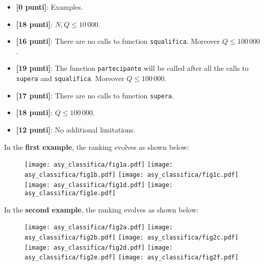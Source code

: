 \begin{itemize}[nolistsep,itemsep=2mm]
  \item \textbf{ [\phantom{1}0 punti]}: Examples.
  \item \textbf{ [18 punti]}: $N, Q \leq 10\,000$.
  \item \textbf{ [16 punti]}: There are no calls to function \texttt{squalifica}. Moreover $Q \leq 100\,000$.
  \item \textbf{ [19 punti]}: The function \texttt{partecipante} will be called after all the calls to \texttt{supera} and \texttt{squalifica}. Moreover $Q \leq 100\,000$.
  \item \textbf{ [17 punti]}: There are no calls to function \texttt{supera}.
  \item \textbf{ [18 punti]}: $Q \leq 100\,000$.
  \item \textbf{ [12 punti]}: No additional limitations.
\end{itemize}



\Examples

\begin{example}
%
%
\end{example}


\pagebreak

\Explanation

In the \textbf{first example}, the ranking evolves as shown below:
\begin{figure}[H]
	\centering
	\texttt{[image: asy\_classifica/fig1a.pdf]}
	\texttt{[image: asy\_classifica/fig1b.pdf]}
	\texttt{[image: asy\_classifica/fig1c.pdf]}
	\texttt{[image: asy\_classifica/fig1d.pdf]}
	\texttt{[image: asy\_classifica/fig1e.pdf]}
\end{figure}

In the \textbf{second example}, the ranking evolves as shown below:
\begin{figure}[H]
	\centering
	\texttt{[image: asy\_classifica/fig2a.pdf]}
	\texttt{[image: asy\_classifica/fig2b.pdf]}
	\texttt{[image: asy\_classifica/fig2c.pdf]}
	\texttt{[image: asy\_classifica/fig2d.pdf]}
	\texttt{[image: asy\_classifica/fig2e.pdf]}
	\texttt{[image: asy\_classifica/fig2f.pdf]}
\end{figure}

\begin{solution}
	
\end{solution}
